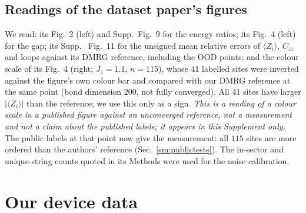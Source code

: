 \documentclass[aps,prx,onecolumn,10pt,nofootinbib,longbibliography,floatfix]{revtex4-2}
\theoremstyle{remark}
\newcommand{\Jz}{J_z}
\begin{document}
\subsection{Readings of the dataset paper's figures}
We read: its Fig.~2 (left) and Supp.\ Fig.~9 for the energy ratios; its Fig.~4 (left) for the gap; its Supp.\ %
Fig.~11 for the unsigned mean relative errors of $\langle Z_i\rangle$, $C_{zz}$ and loops against its DMRG reference, %
including the OOD points; and the colour scale of its Fig.~4 (right; $\Jz=1.1$, $n=115$), whose 41 labelled sites %
were inverted against the figure's own colour bar and compared with our DMRG reference at the same point (bond
dimension $200$, not fully converged). All 41 sites have larger $|\langle Z_i\rangle|$ than the reference; we use this %
only as a sign. \emph{This is a reading of a colour scale in a published figure against an unconverged reference,
not a measurement and not a claim about the published labels; it appears in this Supplement only.} The public
labels at that point now give the measurement: all $115$ sites are more ordered than the authors' reference %
(Sec.~\ref{sm:publictests}). The in-sector and unique-string counts quoted in its Methods were used for the noise calibration.

\section{Our device data}
\label{sm:qpu}
\end{document}
